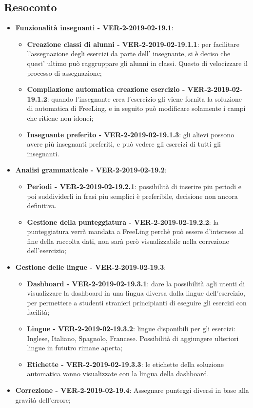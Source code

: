 \documentclass[a4paper, oneside, openany, dvipsnames, table]{article}
\begin{document}
\subsection{Resoconto}
\begin{itemize}
	\item \textbf{Funzionalità insegnanti - VER-2-2019-02-19.1}: 
	\begin{itemize}
		\item \textbf{Creazione classi di alunni - VER-2-2019-02-19.1.1}: per facilitare l'assegnazione degli esercizi da parte dell' insegnante,
		 si è deciso che quest' ultimo può raggruppare gli alunni in classi. Questo di velocizzare
		il processo di assegnazione;
		\item \textbf{Compilazione automatica creazione esercizio - VER-2-2019-02-19.1.2}:
		quando l'insegnante crea l'esercizio gli viene fornita la soluzione di automatica di FreeLing,
		e in seguito può modificare solamente i campi che ritiene non idonei;
		\item \textbf{Insegnante preferito - VER-2-2019-02-19.1.3}: 
		gli alievi possono avere più insegnanti preferiti, e può vedere gli esercizi di tutti gli insegnanti.
	\end{itemize}
	\item \textbf{Analisi grammaticale - VER-2-2019-02-19.2}:
	\begin{itemize}
		\item \textbf{Periodi - VER-2-2019-02-19.2.1}: possibilità di inserire piu periodi e poi suddividerli in frasi piu semplici è preferibile, decisione non ancora definitiva.
		\item \textbf{Gestione della punteggiatura - VER-2-2019-02-19.2.2}: la punteggiatura verrà mandata a FreeLing perchè 
		può essere d'interesse al fine della raccolta dati, non sarà però visualizzabile nella correzione dell'esercizio;
	\end{itemize}
	\item \textbf{Gestione delle lingue - VER-2-2019-02-19.3}: 
	\begin{itemize}
		\item \textbf{Dashboard - VER-2-2019-02-19.3.1}: dare la possibilità agli utenti di visualizzare la dashboard in una lingua diversa dalla lingue dell'esercizio,
		per permettere a studenti stranieri principianti di eseguire gli esercizi con facilità;
		\item \textbf{Lingue - VER-2-2019-02-19.3.2}: lingue disponibili per gli esercizi: 
		Inglese, Italiano, Spagnolo, Francese. Possibilità di aggiungere ulteriori lingue in fututro rimane aperta;
		\item \textbf{Etichette - VER-2-2019-02-19.3.3}: le etichette della soluzione automatica
		vanno visualizzate con la lingua della dashboard.
	\end{itemize}
	\item \textbf{Correzione - VER-2-2019-02-19.4}:
	Assegnare punteggi diversi in base alla gravità dell'errore;
	

\end{itemize}
\end{document}
